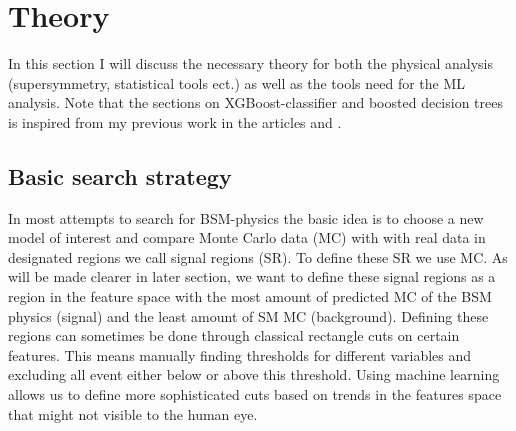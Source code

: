 \documentclass{article}
\begin{document}
\section{Theory}
In this section I will discuss the necessary theory for both the physical analysis (supersymmetry, statistical tools ect.) as well as the tools need for the ML analysis. Note that the sections on XGBoost-classifier and boosted decision trees  is inspired from my previous work in the articles \cite{FYSSTK} and \cite{HIGGS}.
\subsection{Basic search strategy}
In most attempts to search for BSM-physics the basic idea is to choose a new model of interest and compare Monte Carlo data (MC) with with real data in designated regions we call signal regions (SR). To define these SR we use MC. As will be made clearer in later section, we want to define these signal regions as a region in the feature space with the most amount of predicted MC of the BSM physics (signal) and the least amount of SM MC (background). Defining these regions can sometimes be done through classical rectangle cuts on certain features. This means manually finding thresholds for different variables and excluding all event either below or above this threshold. Using machine learning allows us to define more sophisticated cuts based on trends in the features space that might not visible to the human eye. 
\end{document}
